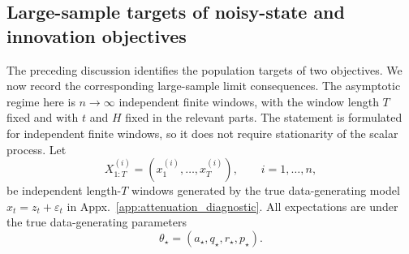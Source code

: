 \documentclass{article}
\theoremstyle{plain}
\theoremstyle{definition}
\theoremstyle{remark}
\begin{document}
\subsection{Large-sample targets of noisy-state and innovation objectives}
\label{app:linear_consistency}

The preceding discussion identifies the population targets
of two objectives. We now record the corresponding large-sample limit consequences. The asymptotic regime here is $n\to\infty$ independent finite windows, with the
window length $T$ fixed and with $t$ and $H$ fixed in the relevant parts. The statement is formulated for independent finite windows, so it
does not require stationarity of the scalar process.
Let
\[
X_{1:T}^{(i)}=(x_1^{(i)},\ldots,x_T^{(i)}),
\qquad i=1,\ldots,n,
\]
be independent length-$T$ windows generated by the true data-generating model $x_t = z_t + \varepsilon_t$ in Appx.~\ref{app:attenuation_diagnostic}.  All expectations are under the true data-generating parameters
\[
\theta_\star=(a_\star,q_\star,r_\star,p_\star).
\]
\end{document}
